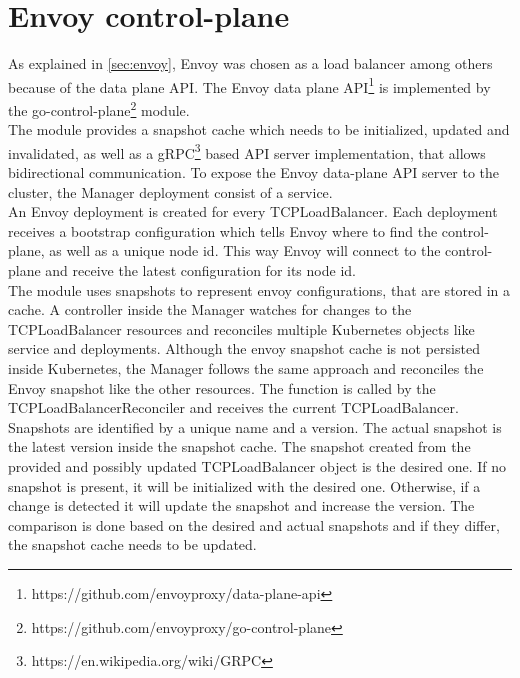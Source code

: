 \section{Envoy control-plane}\label{sec:envoy-control-plane}
As explained in \autoref{sec:envoy}, Envoy was chosen as a load balancer among others because of the data plane API.
The Envoy data plane API\footnote{https://github.com/envoyproxy/data-plane-api} is implemented by the go-control-plane\footnote{https://github.com/envoyproxy/go-control-plane} module.
\\
The module provides a snapshot cache which needs to be initialized, updated and invalidated, as well as a gRPC\footnote{https://en.wikipedia.org/wiki/GRPC} based API server implementation, that allows bidirectional communication.
To expose the Envoy data-plane API server to the cluster, the Manager deployment consist of a service.
\\
An Envoy deployment is created for every TCPLoadBalancer.
Each deployment receives a bootstrap configuration which tells Envoy where to find the control-plane, as well as a unique node id.
This way Envoy will connect to the control-plane and receive the latest configuration for its node id.
\\
The module uses snapshots to represent envoy configurations, that are stored in a cache.
A controller inside the Manager watches for changes to the TCPLoadBalancer resources and reconciles multiple Kubernetes objects like service and deployments.
Although the envoy snapshot cache is not persisted inside Kubernetes, the Manager follows the same approach and reconciles the Envoy snapshot like the other resources.
The function is called by the TCPLoadBalancerReconciler and receives the current TCPLoadBalancer.
Snapshots are identified by a unique name and a version.
The actual snapshot is the latest version inside the snapshot cache.
The snapshot created from the provided and possibly updated TCPLoadBalancer object is the desired one.
If no snapshot is present, it will be initialized with the desired one.
Otherwise, if a change is detected it will update the snapshot and increase the version.
The comparison is done based on the desired and actual snapshots and if they differ, the snapshot cache needs to be updated.
\\

